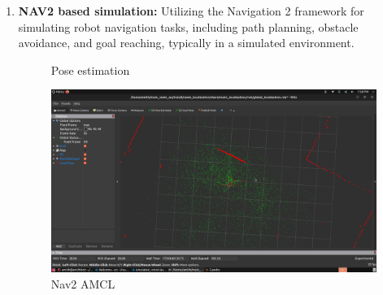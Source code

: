 {\begin{enumerate}[label=\textbf{\arabic*}., leftmargin=*]
		
		\item \textbf{NAV2 based simulation:} Utilizing the Navigation 2 framework for simulating robot
		navigation tasks, including path planning, obstacle avoidance, and goal reaching, typically
		in a simulated environment.
		
		\begin{figure}[H]
			\centering
			\hfill
			\hfill
			\caption{Pose estimation}
			\label{fig:posestim}
		\end{figure}
		
		\begin{figure}[H]
			\centering
			\includegraphics[scale=0.2]{images/Content/Nav2_AMCL.png}
			\caption{Nav2 AMCL}
			\label{fig:nav2amcl}
		\end{figure}
		

\end{enumerate}}
